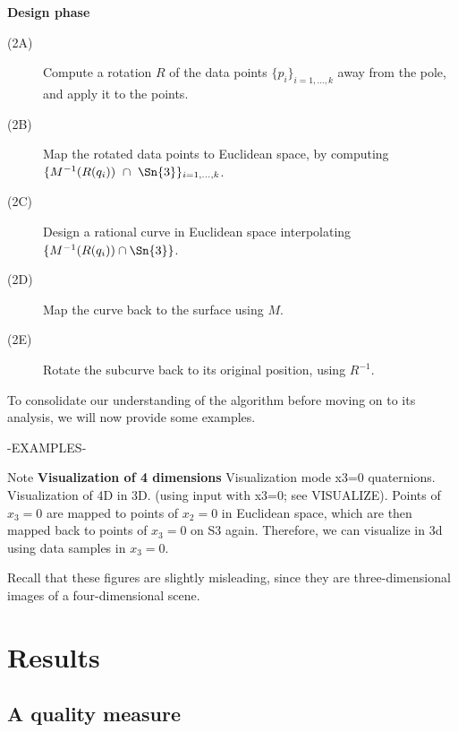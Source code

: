 \vspace{.2in}

\centerline{{\bf Design phase}}
\begin{description}
\item[(2A)] Compute a rotation $R$ of the data points $\{p_i\}_{i=1,\ldots,k}$
	away from the pole, and apply it to the points.
\item[(2B)] Map the rotated data points to Euclidean space, by computing 
	$\{M^{-1}(R(q_i)) \ \cap \ \Sn{3}\}_{i=1,\ldots,k}$.
\item[(2C)] Design a rational curve in Euclidean space
	interpolating $\{M^{-1}(R(q_i)) \cap \Sn{3}\}$.
\item[(2D)] Map the curve back to the surface using $M$.
\item[(2E)] Rotate the subcurve back to its original position, using $R^{-1}$.
\end{description}

To consolidate our understanding of the algorithm before moving on to its
analysis, we will now provide some examples.

-EXAMPLES-

Note {\bf Visualization of 4 dimensions}
Visualization mode x3=0 quaternions.  Visualization of 4D in 3D.  
(using input with x3=0; see VISUALIZE).
Points of $x_3=0$ are mapped to points of $x_2=0$ in Euclidean space,
which are then mapped back to points of $x_3=0$ on S3 again.
Therefore, we can visualize in 3d using data samples in $x_3=0$.

Recall that these figures are slightly misleading, since they are
three-dimensional images of a four-dimensional scene.

\section{Results}
\label{sec:results}

\subsection{A quality measure}
\label{sec:cov}

